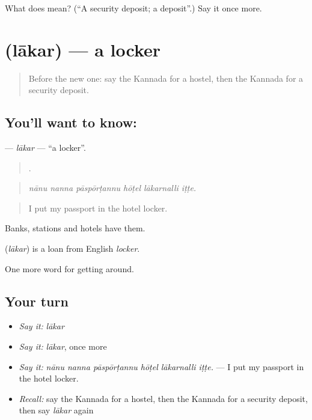 \begin{tcolorbox}[breakable,colback=teal!4,colframe=teal!35!black,title={Before you move on}]
What does  mean? (\textquotedblleft{}A security deposit; a deposit\textquotedblright{}.) Say it once more.
\end{tcolorbox}
\section[\texorpdfstring{\kn{ಲಾಕರ್} (lākar)}{ಲಾಕರ್ (lākar)}]{ (lākar) — a locker}

\label{lesson:KA-C461-lakar}



\begin{quote}
Before the new one: say the Kannada for a hostel, then the Kannada for a security deposit.
\end{quote}

\subsection*{You'll want to know: }
\textbf{} — \emph{lākar} — \textquotedblleft{}a locker\textquotedblright{}.

\begin{quote}
     .
\end{quote}

\begin{quote}
\emph{nānu nanna pāspōrṭannu hōṭel lākarnalli iṭṭe.}
\end{quote}

\begin{quote}
I put my passport in the hotel locker.
\end{quote}

Banks, stations and hotels have them.

\begin{cousinweb}
\textbf{} (\emph{lākar}) is a loan from English \emph{locker}.
\end{cousinweb}

\begin{grammarlens}[title={What you've built}]
One more word for getting around.
\end{grammarlens}

\subsection*{Your turn}
\begin{itemize}
\raggedright
  \item \emph{Say it:} \emph{lākar}
  \item \emph{Say it:} \emph{lākar}, once more
  \item \emph{Say it:} \emph{nānu nanna pāspōrṭannu hōṭel lākarnalli iṭṭe.} — I put my passport in the hotel locker.
  \item \emph{Recall:} say the Kannada for a hostel, then the Kannada for a security deposit, then say \emph{lākar} again
\end{itemize}

